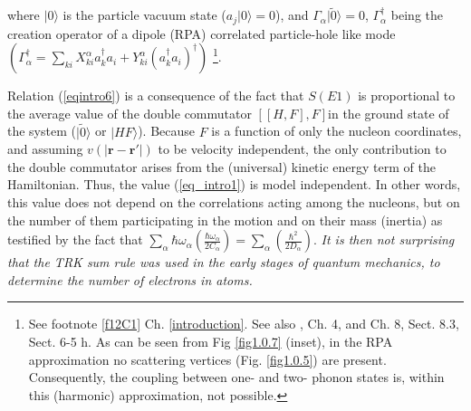 where $|0\rangle$ is the particle vacuum state ($a_j|0\rangle=0$), and $\Gamma_\alpha|\tilde 0\rangle=0$, $\Gamma^\dagger_\alpha$ being the creation operator of a dipole  (RPA) correlated particle-hole like mode $(\Gamma_\alpha^\dagger=\sum_{ki}X_{ki}^\alpha a_k^\dagger a_i+Y^\alpha_{ki}(a_k^\dagger a_i)^\dagger)$ \footnote{See footnote \ref{f12C1} Ch. \ref{introduction}. See also \cite{Bertsch:05}, Ch. 4, and \cite{Brink:05} Ch. 8, Sect. 8.3, \cite{Bohr:75} Sect. 6-5 h. As can be seen from Fig  \ref{fig1.0.7} (inset), in the RPA approximation no scattering vertices (Fig. \ref{fig1.0.5}) are present. Consequently, the coupling between one- and two- phonon states is, within this (harmonic) approximation, not possible.}. 


Relation (\ref{eqintro6}) is a consequence of the fact that $S(E1)$ is proportional to the average value of the double  commutator $[[H,F],F]$in the ground state of the system ($|\tilde 0\rangle$ or $|HF\rangle$). Because $F$ is a function of only the nucleon coordinates, and assuming $v(|\mathbf{r}-\mathbf{r}'|)$ to be velocity independent, the only contribution to the double commutator arises from the (universal) kinetic energy term of the Hamiltonian. Thus, the value (\ref{eq_intro1}) is model independent. In other words, this value does not depend on the correlations acting among the nucleons, but on the number of them participating in the motion and on their mass (inertia) as testified by the fact that $\sum_{\alpha}\hbar \omega_\alpha\left(\frac{\hbar\omega_\alpha}{2C_\alpha}\right)=\sum_{\alpha}\left(\frac{\hbar^2}{2D_\alpha}\right)$. \textit{It is then not surprising that the TRK sum rule was used in the early stages of quantum mechanics, to determine the number of electrons in atoms.}

